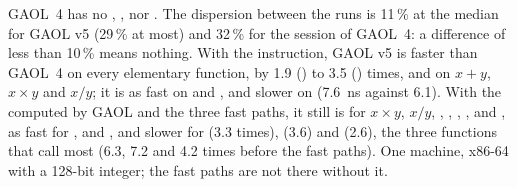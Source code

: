 GAOL~4 has no , ,  nor
. The dispersion between the runs is 11\,\% at the median
for GAOL v5 (29\,\% at most) and 32\,\% for the session of GAOL~4: a difference
of less than 10\,\% means nothing. With the instruction, GAOL v5 is faster than
GAOL~4 on every elementary function, by 1.9 () to 3.5 ()
times, and on $x + y$, $x \times y$ and $x / y$; it is as fast on
 and , and slower on  (7.6~ns against
6.1). With the  computed by
GAOL and the three fast paths, it still is for $x \times y$, $x / y$,
, , , ,  and , as
fast for ,  and , and slower for  (3.3
times),  (3.6) and  (2.6), the three functions that
call  most (6.3, 7.2 and 4.2 times before the fast paths). One
machine, x86-64 with a 128-bit integer; the fast paths are not there
without it.

